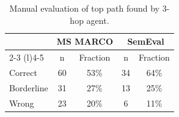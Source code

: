 \begin{table}
\caption{Manual evaluation of top path found by 3-hop agent.}
\label{manual-evaluation-table}
\setlength{\tabcolsep}{12pt}
\begin{tabular}{@{}lcccc@{}}
\toprule
 & \multicolumn{2}{c}{\textbf{MS MARCO}} & \multicolumn{2}{c}{\textbf{SemEval}} \\ \cmidrule(lr){2-3} \cmidrule(l){4-5} 
 & n & Fraction & n & Fraction \\
\midrule
Correct    & 60 & 53\% & 34 & 64\% \\
Borderline & 31 & 27\% & 13 & 25\% \\
Wrong      & 23 & 20\% &  6 & 11\% \\
\bottomrule
\end{tabular}
\end{table}
